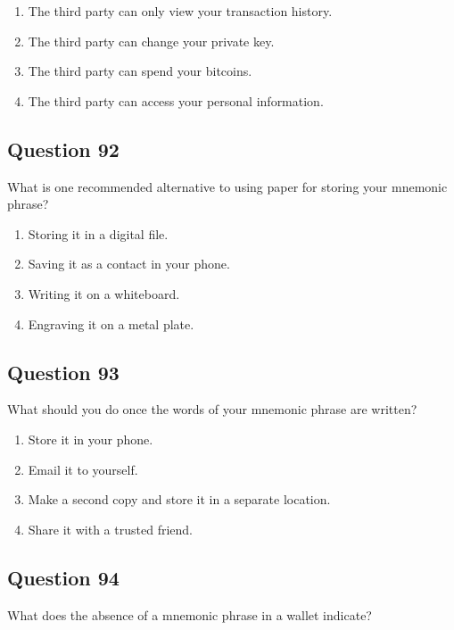 \documentclass[12pt,a4paper]{article}
\begin{document}
\begin{enumerate}[label=\Alph*., leftmargin=*]
\item The third party can only view your transaction history.
\item The third party can change your private key.
\item The third party can spend your bitcoins.
\item The third party can access your personal information.
\end{enumerate}

\bigskip


\subsection*{Question 92}
What is one recommended alternative to using paper for storing your mnemonic phrase?

\begin{enumerate}[label=\Alph*., leftmargin=*]
\item Storing it in a digital file.
\item Saving it as a contact in your phone.
\item Writing it on a whiteboard.
\item Engraving it on a metal plate.
\end{enumerate}

\bigskip


\subsection*{Question 93}
What should you do once the words of your mnemonic phrase are written?

\begin{enumerate}[label=\Alph*., leftmargin=*]
\item Store it in your phone.
\item Email it to yourself.
\item Make a second copy and store it in a separate location.
\item Share it with a trusted friend.
\end{enumerate}

\bigskip


\subsection*{Question 94}
What does the absence of a mnemonic phrase in a wallet indicate?
\end{document}
